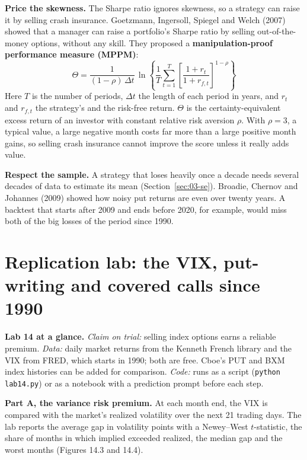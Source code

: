 \textbf{Price the skewness.} The Sharpe ratio ignores skewness, so a strategy can raise it by selling crash insurance. Goetzmann, Ingersoll, Spiegel and Welch (2007) showed that a manager can raise a portfolio's Sharpe ratio by selling out-of-the-money options, without any skill. They proposed a \textbf{manipulation-proof performance measure (MPPM)}:
\begin{equation}
  \Theta = \frac{1}{(1 - \rho)\,\Delta t}\,\ln\!\left\{\frac{1}{T}\sum_{t=1}^{T}\left[\frac{1 + r_t}{1 + r_{f,t}}\right]^{1-\rho}\right\}
  \label{eq:14-mppm}
\end{equation}
Here $T$ is the number of periods, $\Delta t$ the length of each period in years, and $r_t$ and $r_{f,t}$ the strategy's and the risk-free return. $\Theta$ is the certainty-equivalent excess return of an investor with constant relative risk aversion $\rho$. With $\rho = 3$, a typical value, a large negative month costs far more than a large positive month gains, so selling crash insurance cannot improve the score unless it really adds value.

\textbf{Respect the sample.} A strategy that loses heavily once a decade needs several decades of data to estimate its mean (Section~\ref{sec:03-se}). Broadie, Chernov and Johannes (2009) showed how noisy put returns are even over twenty years. A backtest that starts after 2009 and ends before 2020, for example, would miss both of the big losses of the period since 1990.

\section{Replication lab: the VIX, put-writing and covered calls since 1990}
\label{sec:14-lab}

\begin{callout}
\textbf{Lab 14 at a glance.} \emph{Claim on trial:} selling index options earns a reliable premium. \emph{Data:} daily market returns from the Kenneth French library and the VIX from FRED, which starts in 1990; both are free. Cboe's PUT and BXM index histories can be added for comparison. \emph{Code:} runs as a script (\texttt{python lab14.py}) or as a notebook with a prediction prompt before each step.
\end{callout}

\textbf{Part A, the variance risk premium.} At each month end, the VIX is compared with the market's realized volatility over the next 21 trading days. The lab reports the average gap in volatility points with a Newey--West $t$-statistic, the share of months in which implied exceeded realized, the median gap and the worst months (Figures 14.3 and 14.4).

